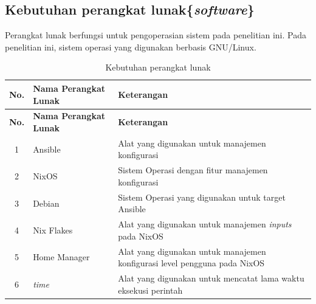 \documentclass[10pt,]{report}
\begin{document}
\begin{adjustwidth}{7mm}{}
	\subsection{Kebutuhan perangkat lunak\{\textit{software}\} }
	\vspace{-2mm}
	\begin{adjustwidth}{6mm}{}
		Perangkat lunak berfungsi untuk pengoperasian sistem pada penelitian ini.
		Pada penelitian ini, sistem operasi yang digunakan berbasis GNU/Linux.\\
		\begin{longtable}[r]{|c|p{2cm}|>{\raggedright\arraybackslash}p{4.7cm}|}
			\caption{Kebutuhan perangkat lunak} \tabularnewline  \hline
			\textbf{No.} & \textbf{Nama Perangkat Lunak} & \textbf{Keterangan}                                                       \\
			\endfirsthead
			\textbf{No.} & \textbf{Nama Perangkat Lunak} & \textbf{Keterangan}                                                       \\
			\hline
			\endhead
			\hline
			1            & Ansible                       & Alat yang digunakan untuk manajemen konfigurasi                           \\
			\hline
			2            & NixOS                         & Sistem Operasi dengan fitur manajemen konfigurasi                         \\
			\hline
			3            & Debian                        & Sistem Operasi yang digunakan untuk target Ansible                        \\
			\hline
			4            & Nix Flakes                    & Alat yang digunakan untuk manajemen \textit{inputs} pada NixOS            \\
			\hline
			5            & Home Manager                  & Alat yang digunakan untuk manajemen konfigurasi level pengguna pada NixOS \\
			\hline
			6            & \textit{time}                 & Alat yang digunakan untuk mencatat lama waktu eksekusi perintah           \\
			\hline
		\end{longtable}
	\end{adjustwidth}
\end{adjustwidth}
\end{document}
